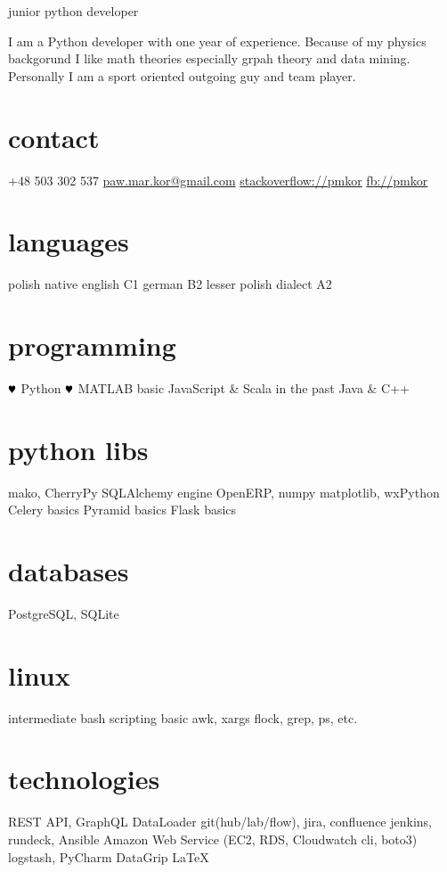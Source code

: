 \documentclass[]{friggeri-cv}
\newcommand{\heart}{\ensuremath\varheartsuit}
\begin{document}
       {junior python developer}

\begin{abstract_pk}
I am a Python developer with one year of experience. Because of my physics backgorund I like math theories especially grpah theory and data mining. Personally I am a sport oriented outgoing guy and team player.
\end{abstract_pk}

\begin{aside}
  \section{contact}
    +48 503 302 537
    \href{mailto:paw.mar.kor@gmail.com}{paw.mar.kor@gmail.com}
    \href{http://stackoverflow.com/users/2999347/pmkor}{stackoverflow://pmkor}
    \href{http://facebook.com/pmkor}{fb://pmkor}
  \section{languages}
    polish native
    english C1
    german B2
    lesser polish dialect A2
  \section{programming}
    {\color{red} $\heart$} Python {\color{red} $\heart$}
    MATLAB
    basic JavaScript \& Scala
    in the past Java \& C++
  \section{python libs}
   mako, CherryPy
   SQLAlchemy engine
   OpenERP, numpy
   matplotlib, wxPython
   Celery basics
   Pyramid basics
   Flask basics
   \section{databases}
    PostgreSQL, SQLite
  \section{linux}
    intermediate bash scripting
   basic awk, xargs
  flock, grep, ps, etc.
  \section{technologies}
   REST API, GraphQL DataLoader
    git(hub/lab/flow), jira, confluence
    jenkins, rundeck, Ansible
   Amazon Web Service
   (EC2, RDS, Cloudwatch cli, boto3)
   logstash, PyCharm DataGrip
   \LaTeX
\end{aside}
\end{document}
